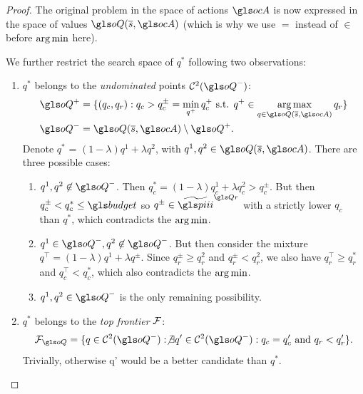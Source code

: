 \begin{proof}
    The original problem in the space of actions $\ocA$ is now expressed in the space of values $\oQ(\os, \ocA)$ (which is why we use $=$ instead of $\in$ before $\operatorname*{arg\,min}$ here).

    We further restrict the search space of $q^*$ following two observations:
    \begin{enumerate}
        \item $q^*$ belongs to the \emph{undominated} points $\cC^2(\oQ^-)$:
        \begin{align}
            \label{eq:q_minus_undominated}
            \oQ^+ &= \{(q_c, q_r): q_c > q_c^{\pm} = \min_{q^+} q_c^+\text{ s.t. }q^+\in\argmax_{q\in \oQ(\os,\ocA)} q_r\}\\
            \oQ^- &= \oQ(\os,\ocA) \setminus \oQ^+.
        \end{align}
        Denote $q^*$ = $(1-\lambda) q^1 + \lambda q^2$, with $q^1, q^2\in \oQ(\os,\ocA)$. There are three possible cases:
        \begin{enumerate}
            \item $q^1, q^2 \not\in \oQ^-$. Then $q_c^* = (1-\lambda) q^1_c + \lambda q^2_c > q_c^{\pm}$. But then $q_c^{\pm} < q_c^* \leq \budget$ so $q^{\pm}\in\tilde{\policies}^{\Qr}$ with a strictly lower $q_c$ than $q^*$, which contradicts the $\operatorname*{arg\,min}$.
            \item $q^1\in \oQ^-, q^2 \not\in \oQ^-$. But then consider the mixture $q^\top = (1-\lambda) q^1 + \lambda q^\pm$. Since $q_r^{\pm} \geq q_r^{2}$ and $q_r^{\pm} < q_r^{2}$, we also have $q^\top_r \geq q_r^*$ and $q^\top_c < q_c^*$, which also contradicts the $\operatorname*{arg\,min}$.
            \item $q^1,q^2\in \oQ^-$ is the only remaining possibility.
        \end{enumerate}
        \item $q^*$ belongs to the \emph{top frontier} $\mathcal{F}$:
        \begin{equation}
            \label{eq:top-frontier}
            \cF_{\oQ} = \{q\in \cC^2(\oQ^-): \not\exists q'\in \cC^2(\oQ^-): q_c=q_c'\text{ and }q_r<q_r'\}.
        \end{equation}
        Trivially, otherwise q' would be a better candidate than $q^*$.
    \end{enumerate}



\end{proof}
